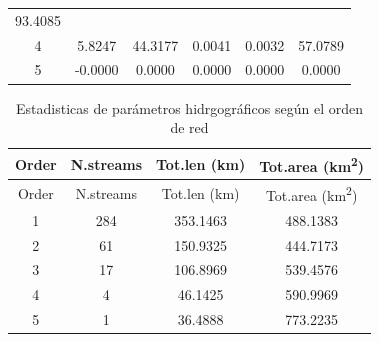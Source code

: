 \documentclass[11pt,]{article}
\begin{document}
\begin{longtable}[]{@{}cccccc@{}}
\begin{minipage}[t]{0.13\columnwidth}
93.4085\strut
\end{minipage}\tabularnewline
\begin{minipage}[t]{0.08\columnwidth}\centering\strut
4\strut
\end{minipage} & \begin{minipage}[t]{0.11\columnwidth}\centering\strut
5.8247\strut
\end{minipage} & \begin{minipage}[t]{0.26\columnwidth}\centering\strut
44.3177\strut
\end{minipage} & \begin{minipage}[t]{0.11\columnwidth}\centering\strut
0.0041\strut
\end{minipage} & \begin{minipage}[t]{0.14\columnwidth}\centering\strut
0.0032\strut
\end{minipage} & \begin{minipage}[t]{0.13\columnwidth}\centering\strut
57.0789\strut
\end{minipage}\tabularnewline
\begin{minipage}[t]{0.08\columnwidth}\centering\strut
5\strut
\end{minipage} & \begin{minipage}[t]{0.11\columnwidth}\centering\strut
-0.0000\strut
\end{minipage} & \begin{minipage}[t]{0.26\columnwidth}\centering\strut
0.0000\strut
\end{minipage} & \begin{minipage}[t]{0.11\columnwidth}\centering\strut
0.0000\strut
\end{minipage} & \begin{minipage}[t]{0.14\columnwidth}\centering\strut
0.0000\strut
\end{minipage} & \begin{minipage}[t]{0.13\columnwidth}\centering\strut
0.0000\strut
\end{minipage}\tabularnewline
\bottomrule
\end{longtable}

\begin{longtable}[]{@{}cccc@{}}
\caption{\label{tab:parh} Estadisticas de parámetros hidrgográficos
según el orden de red}\tabularnewline
\toprule
Order & N.streams & Tot.len (km) & Tot.area
(km\textsuperscript{2})\tabularnewline
\midrule
\endfirsthead
\toprule
Order & N.streams & Tot.len (km) & Tot.area
(km\textsuperscript{2})\tabularnewline
\midrule
\endhead
1 & 284 & 353.1463 & 488.1383\tabularnewline
2 & 61 & 150.9325 & 444.7173\tabularnewline
3 & 17 & 106.8969 & 539.4576\tabularnewline
4 & 4 & 46.1425 & 590.9969\tabularnewline
5 & 1 & 36.4888 & 773.2235\tabularnewline
\bottomrule
\end{longtable}
\end{document}

